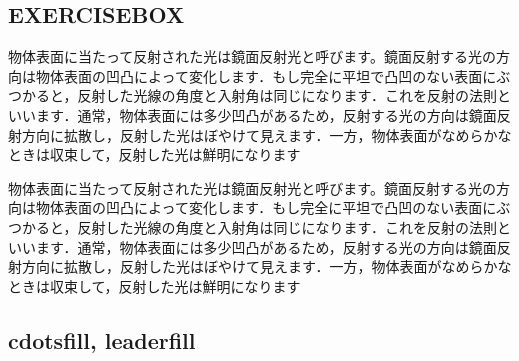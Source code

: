 \documentclass[../main]{subfiles}
\begin{document}
\leaderfill

\subsection{EXERCISEBOX}
\begin{EXERCISEBOX}[鏡面反射光]
    物体表面に当たって反射された光は鏡面反射光と呼びます。鏡面反射する光の方向は物体表面の凹凸によって変化します．もし完全に平坦で凸凹のない表面にぶつかると，反射した光線の角度と入射角は同じになります．これを反射の法則といいます．通常，物体表面には多少凹凸があるため，反射する光の方向は鏡面反射方向に拡散し，反射した光はぼやけて見えます．一方，物体表面がなめらかなときは収束して，反射した光は鮮明になります
\end{EXERCISEBOX}
\begin{code}[language=tex]
\begin{EXERCISEBOX}[鏡面反射光]
    物体表面に当たって反射された光は鏡面反射光と呼びます。鏡面反射する光の方向は物体表面の凹凸によって変化します．もし完全に平坦で凸凹のない表面にぶつかると，反射した光線の角度と入射角は同じになります．これを反射の法則といいます．通常，物体表面には多少凹凸があるため，反射する光の方向は鏡面反射方向に拡散し，反射した光はぼやけて見えます．一方，物体表面がなめらかなときは収束して，反射した光は鮮明になります
\end{EXERCISEBOX}
\end{code}

\leaderfill

\subsection{cdotsfill, leaderfill}
\leaderfill
\begin{code}[language=tex]
\leaderfill
\end{code}

\leaderfill
\end{document}
